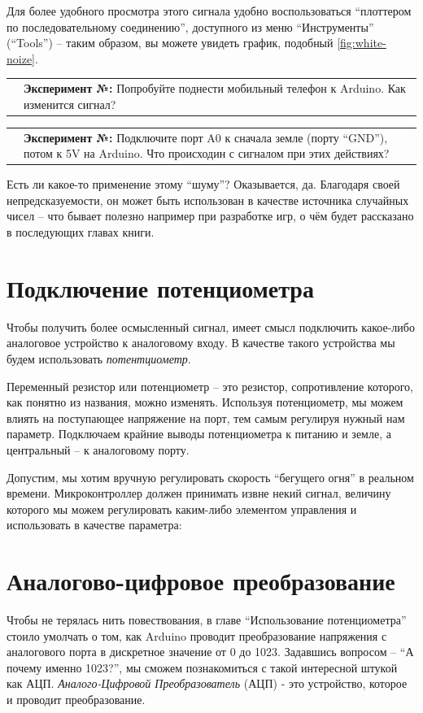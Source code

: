 \documentclass[a4paper,twoside]{book}
\newcounter{experiment-counter}
\newcommand{\experiment}[2]{
  \vspace{8pt}
  \begin{tabularx}{\textwidth}{m{1cm} m{9cm}}
    
    & \textbf{Эксперимент №\arabic{experiment-counter}:} #2 \\
  \end{tabularx}
  \addtocounter{experiment-counter}{1}
}
\begin{document}
Для более удобного просмотра этого сигнала удобно воспользоваться ``плоттером по
последовательному соединению'', доступного из меню ``Инструменты'' (``Tools'') --
таким образом, вы можете увидеть график, подобный \ref{fig:white-noize}.

\experiment{0}{Попробуйте поднести мобильный телефон к Arduino.  Как изменится
  сигнал?}

\experiment{1}{Подключите порт A0 к сначала земле (порту ``GND''), потом к 5V на
  Arduino.  Что происходин с сигналом при этих действиях?}

Есть ли какое-то применение этому ``шуму''?  Оказывается, да.  Благодаря своей
непредсказуемости, он может быть использован в качестве источника случайных
чисел -- что бывает полезно например при разработке игр, о чём будет рассказано в
последующих главах книги.

\section{Подключение потенциометра}

Чтобы получить более осмысленный сигнал, имеет смысл подключить какое-либо
аналоговое устройство к аналоговому входу.  В качестве такого устройства мы
будем использовать \emph{потентциометр}.

Переменный резистор или потенциометр -- это резистор, сопротивление которого, как
понятно из названия, можно изменять. Используя потенциометр, мы можем влиять на
поступающее напряжение на порт, тем самым регулируя нужный нам параметр.
Подключаем крайние выводы потенциометра к питанию и земле, а центральный -- к
аналоговому порту.

Допустим, мы хотим вручную регулировать скорость ``бегущего огня'' в реальном
времени. Микроконтроллер должен принимать извне некий сигнал, величину которого
мы можем регулировать каким-либо элементом управления и использовать в качестве
параметра:

\section{Аналогово-цифровое преобразование}

Чтобы не терялась нить повествования, в главе ``Использование потенциометра''
стоило умолчать о том, как Arduino проводит преобразование напряжения с
аналогового порта в дискретное значение от 0 до 1023. Задавшись вопросом -- ``А
почему именно 1023?'', мы сможем познакомиться с такой интересной штукой как
АЦП. \emph{Аналого-Цифровой Преобразователь} (АЦП) - это устройство, которое и
проводит преобразование.
\end{document}
